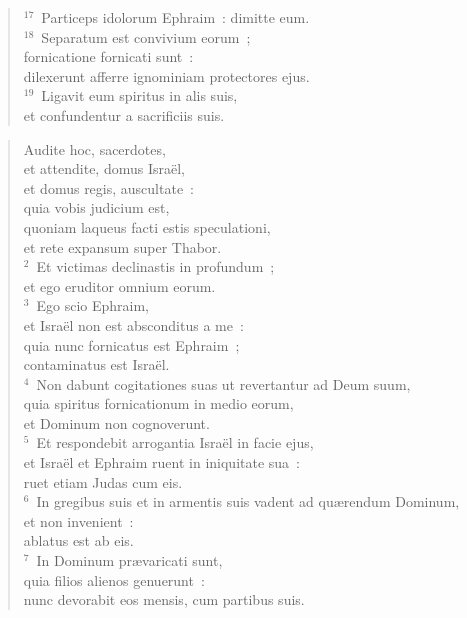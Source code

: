 \begin{flushleft}
\begin{verse}
${}^{17}$~Particeps idolorum Ephraim~: dimitte eum.\\
${}^{18}$~Separatum est convivium eorum~;\\ fornicatione fornicati sunt~:\\ dilexerunt afferre ignominiam protectores ejus.\\
${}^{19}$~Ligavit eum spiritus in alis suis,\\ et confundentur a sacrificiis suis.\end{verse}\end{flushleft}


\begin{flushleft}\begin{verse}\vspace{-19pt}Audite hoc, sacerdotes, \\ et attendite, domus Isra\"el,\\ et domus regis, auscultate~:\\ quia vobis judicium est,\\ quoniam laqueus facti estis speculationi,\\ et rete expansum super Thabor.\\
${}^{2}$~Et victimas declinastis in profundum~;\\ et ego eruditor omnium eorum.\\
${}^{3}$~Ego scio Ephraim,\\ et Isra\"el non est absconditus a me~:\\ quia nunc fornicatus est Ephraim~;\\ contaminatus est Isra\"el.\\
${}^{4}$~Non dabunt cogitationes suas ut revertantur ad Deum suum,\\ quia spiritus fornicationum in medio eorum,\\ et Dominum non cognoverunt.\\
${}^{5}$~Et respondebit arrogantia Isra\"el in facie ejus,\\ et Isra\"el et Ephraim ruent in iniquitate sua~:\\ ruet etiam Judas cum eis.\\
${}^{6}$~In gregibus suis et in armentis suis vadent ad qu\ae rendum Dominum,\\ et non invenient~:\\ ablatus est ab eis.\\
${}^{7}$~In Dominum pr\ae varicati sunt,\\ quia filios alienos genuerunt~:\\ nunc devorabit eos mensis, cum partibus suis.\\

\end{verse}
\end{flushleft}
